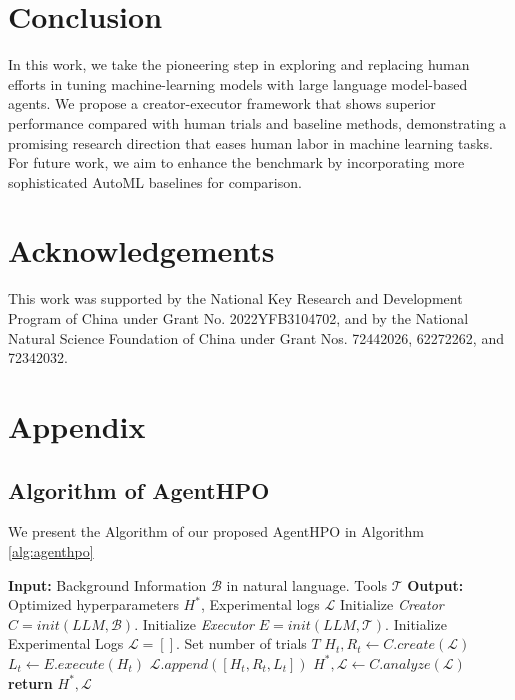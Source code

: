 \documentclass{article}
\begin{document}
\section{Conclusion}
In this work, we take the pioneering step in exploring and replacing human efforts in tuning machine-learning models with large language model-based agents.
We propose a creator-executor framework that shows superior performance compared with human trials and baseline methods, demonstrating a promising research direction that eases human labor in machine learning tasks. For future work, we aim to enhance the benchmark by incorporating more sophisticated AutoML baselines for comparison.



\section*{Acknowledgements}

This work was supported by the National Key Research and Development Program of China under Grant No. 2022YFB3104702, and by the National Natural Science Foundation of China under Grant Nos. 72442026, 62272262, and 72342032. 








\newpage
\appendix
\section{Appendix}
\subsection{Algorithm of AgentHPO}
We present the Algorithm of our proposed AgentHPO in Algorithm \ref{alg:agenthpo}
\begin{algorithm}[]
\caption{The optimization algorithm of AgentHPO}\label{alg:agenthpo}
\begin{algorithmic}[1]
\STATE \textbf{Input:} Background Information $\mathcal{B}$ in natural language. Tools $\mathcal{T}$ 
\STATE \textbf{Output:} Optimized hyperparameters ${H}^*$, Experimental logs $\mathcal{L}$
\STATE Initialize \textit{Creator} $C = init(LLM, \mathcal{B})$.
\STATE Initialize \textit{Executor} $E = init(LLM, \mathcal{T})$.
\STATE Initialize Experimental Logs $\mathcal{L} = []$.
\STATE Set number of trials $T$
    \STATE ${H}_t, {R}_t \leftarrow C.create(\mathcal{L})$
    \STATE $L_t \leftarrow E.execute({H}_t)$
    \STATE $\mathcal{L}.append([{H}_t, {R}_t, L_t])$
\ENDFOR
\STATE ${H}^*, \mathcal{L} \leftarrow C.analyze(\mathcal{L})$
\STATE \textbf{return} ${H}^*, \mathcal{L}$
\end{algorithmic}
\end{algorithm}
\end{document}
